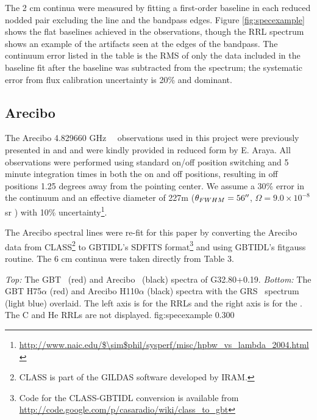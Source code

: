 The 2 cm continua were measured by fitting a first-order baseline in each
reduced nodded pair excluding the line and the bandpass edges.  Figure
\ref{fig:specexample} shows the flat baselines achieved in the observations,
though the RRL spectrum shows an example of the artifacts seen at the edges of
the bandpass.  The continuum error listed in the table is the RMS of only the
data included in the baseline fit after the baseline was subtracted from the
spectrum; the systematic error from flux calibration uncertainty is 20\% and
dominant.  

\subsection{Arecibo} 
The Arecibo 4.829660 GHz \formaldehyde\ \oneone\ observations used in this
project were previously presented in \citet{Araya2002} and \citet{Araya2004}
and were kindly provided in reduced form by E. Araya.  All observations were performed
using standard on/off position switching and 5 minute integration times in both the 
on and off positions, resulting in off positions 1.25 degrees away from the pointing center.
We assume a 30\% error
in the continuum \citep[based on measured gains in the range 2.0-2.5
as reported in][]{Araya2002} and an effective diameter of 227m ($\theta_{FWHM}
= 56\mbox{$^{\prime\prime}$}$, $\Omega=9.0\times10^{-8}$ sr ) with
10\% uncertainty\footnote{\url{http://www.naic.edu/$\sim$phil/sysperf/misc/hpbw\_vs\_lambda\_2004.html}}.

The Arecibo spectral lines were re-fit for this paper by converting the Arecibo data
from CLASS\footnote{CLASS is part of the GILDAS software developed by IRAM.} to
GBTIDL's {\sc SDFITS} format\footnote{Code for the CLASS-GBTIDL conversion is available from
\url{http://code.google.com/p/casaradio/wiki/class\_to\_gbt}}
and using GBTIDL's {\sc fitgauss} routine.  The 6 cm continua were taken
directly from \citet{Araya2002} Table 3.

{ {\it Top:} The GBT \twotwo\ (red) and Arecibo \oneone\ (black) spectra of G32.80+0.19.  
{\it Bottom:} The GBT H75$\alpha$ (red) and Arecibo H110$\alpha$ (black) spectra with the GRS
\thirteenco\ spectrum (light blue) overlaid.   The left axis is for the RRLs and the right
axis is for the \thirteenco.  The C and He RRLs are not displayed.}
{fig:specexample}
{0.30}{0}

